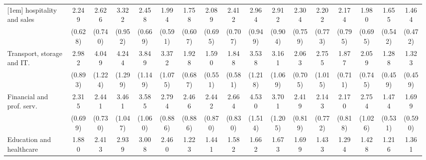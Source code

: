 {\begin{tabular}{l*{16}{c}}
[1em]
hospitality and sales&       2.249\sym{**} &       2.626\sym{***}&       3.322\sym{***}&       2.458\sym{***}&       1.994\sym{*}  &       1.758         &       2.089\sym{*}  &       2.412\sym{**} &       2.964\sym{***}&       2.912\sym{***}&       2.304\sym{*}  &       2.202\sym{*}  &       2.174\sym{*}  &       1.980         &       1.655         &       1.464         \\
                    &     (0.628)         &     (0.740)         &     (0.952)         &     (0.669)         &     (0.591)         &     (0.607)         &     (0.695)         &     (0.707)         &     (0.949)         &     (0.904)         &     (0.759)         &     (0.773)         &     (0.795)         &     (0.695)         &     (0.542)         &     (0.472)         \\
[1em]
Transport, storage and IT.&       2.982\sym{***}&       4.049\sym{***}&       4.244\sym{***}&       3.849\sym{***}&       3.372\sym{***}&       1.928         &       1.590         &       1.848         &       3.538\sym{***}&       3.161\sym{***}&       2.063\sym{*}  &       2.755\sym{**} &       1.877         &       2.059\sym{*}  &       1.288         &       1.323         \\
                    &     (0.893)         &     (1.224)         &     (1.299)         &     (1.149)         &     (1.075)         &     (0.687)         &     (0.551)         &     (0.581)         &     (1.218)         &     (1.069)         &     (0.705)         &     (1.015)         &     (0.711)         &     (0.745)         &     (0.459)         &     (0.459)         \\
[1em]
Financial and prof. serv.&       2.315\sym{**} &       2.441\sym{**} &       3.461\sym{***}&       3.585\sym{***}&       2.794\sym{**} &       2.466\sym{*}  &       2.442\sym{*}  &       2.664\sym{**} &       4.530\sym{***}&       3.701\sym{***}&       2.419\sym{**} &       2.143\sym{*}  &       2.170\sym{*}  &       2.754\sym{**} &       1.474         &       1.699         \\
                    &     (0.699)         &     (0.730)         &     (1.047)         &     (1.060)         &     (0.886)         &     (0.886)         &     (0.870)         &     (0.830)         &     (1.514)         &     (1.205)         &     (0.819)         &     (0.772)         &     (0.818)         &     (1.026)         &     (0.531)         &     (0.590)         \\
[1em]
Education and healthcare&       1.880         &       2.413\sym{**} &       2.939\sym{**} &       3.008\sym{**} &       2.460\sym{*}  &       1.223         &       1.441         &       1.582         &       1.662         &       1.673         &       1.699         &       1.433         &       1.294         &       1.428         &       1.216         &       1.361         \\

\end{tabular}}
